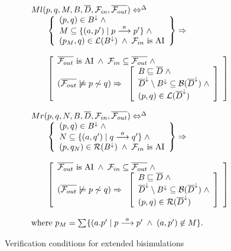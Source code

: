 \begin{figure}
\[\begin{array}{lll}
\multicolumn{3}{l}{Ml(p,q,M,B,\overline{D},{\cal F}_{in},\overline{{\cal F}_{out}}) \Leftrightarrow^{\Delta}}\\
&&\left\{
\begin{array}{l}
(p,q)\in B^{\downarrow}\;\wedge\\
M\subseteq\{(a,p')\mid p\der{a}p'\}\;\wedge\\
(p_M,q)\in{\cal L}(B^{\downarrow})\;\wedge\;{\cal F}_{in} \mbox{ is AI}
\end{array}\right\}\Rightarrow\\
\\
&&\left[
\begin{array}{l}
\overline{{\cal F}_{out}}  \mbox{ is AI} \;\wedge\;{\cal F}_{in}\subseteq\overline{{\cal F}_{out}}\; \wedge\\
(\overline{{\cal F}_{out}}\not\models p\not\sim q)\Rightarrow\;\;
\left[
\begin{array}{l}
B\sqsubseteq \overline{D}\; \wedge\\
\overline{D}^{\downarrow}\setminus B^{\downarrow}\subseteq {\cal B}(\overline{D}^{\downarrow})\;\wedge\\
(p,q)\in{\cal L}(\overline{D}^{\downarrow})
\end{array}
\right]
\end{array}
\right]\\
\\

\multicolumn{3}{l}{Mr(p,q,N,B,\overline{D},{\cal F}_{in},\overline{{\cal F}_{out}}) \Leftrightarrow^{\Delta}}\\
&&\left\{
\begin{array}{l}
(p,q)\in B^{\downarrow}\;\wedge\\
N\subseteq\{(a,q')\mid q\der{a}q'\}\;\wedge\\
(p,q_N)\in{\cal R}(B^{\downarrow})\;\wedge\;{\cal F}_{in} \mbox{ is AI}
\end{array}\right\}\Rightarrow\\
\\
&&\left[
\begin{array}{l}
\overline{{\cal F}_{out}}  \mbox{ is AI} \;\wedge\;{\cal F}_{in}\subseteq\overline{{\cal F}_{out}}\; \wedge\\
(\overline{{\cal F}_{out}}\not\models p\not\sim q)\Rightarrow\;\;
\left[
\begin{array}{l}
B\sqsubseteq \overline{D}\; \wedge\\
\overline{D}^{\downarrow}\setminus B^{\downarrow}\subseteq {\cal B}(\overline{D}^{\downarrow})\;\wedge\\
(p,q)\in{\cal R}(\overline{D}^{\downarrow})
\end{array}
\right]
\end{array}
\right]\\
\\
\multicolumn{3}{l}{\mbox{where } p_M = \sum_{}\{(a.p'\mid p\der{a}p'\;\wedge\;(a,p')\not\in M\}.}

\end{array}
\]
\endgroup
\caption{Verification conditions for extended bisimulations\label{figExtVerification}}
\end{figure}
